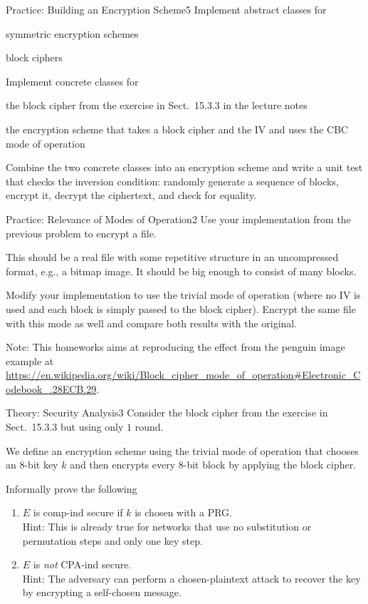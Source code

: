 \documentclass[a4paper]{article}
\begin{document}
\header

\begin{problem}{Practice: Building an Encryption Scheme}{5}
Implement abstract classes for
\begin{compactitem}
 \item symmetric encryption schemes
 \item block ciphers
\end{compactitem}

Implement concrete classes for
\begin{compactitem}
 \item the block cipher from the exercise in Sect.~15.3.3 in the lecture notes
 \item the encryption scheme that takes a block cipher and the IV and uses the CBC mode of operation
\end{compactitem}

Combine the two concrete classes into an encryption scheme and write a unit test that checks the inversion condition: randomly generate a sequence of blocks, encrypt it, decrypt the ciphertext, and check for equality.
\end{problem}

\begin{problem}{Practice: Relevance of Modes of Operation}{2}
Use your implementation from the previous problem to encrypt a file.

This should be a real file with some repetitive structure in an uncompressed format, e.g., a bitmap image.
It should be big enough to consist of many blocks.

Modify your implementation to use the trivial mode of operation (where no IV is used and each block is simply passed to the block cipher).
Encrypt the same file with this mode as well and compare both results with the original.

Note: This homeworks aims at reproducing the effect from the penguin image example at \url{https://en.wikipedia.org/wiki/Block_cipher_mode_of_operation#Electronic_Codebook_.28ECB.29}.
\end{problem}

\begin{problem}{Theory: Security Analysis}{3}
Consider the block cipher from the exercise in Sect.~15.3.3 but using only $1$ round.

We define an encryption scheme using the trivial mode of operation that chooses an $8$-bit key $k$ and then encrypts every $8$-bit block by applying the block cipher.

Informally prove the following
\begin{enumerate}
  \item $E$ is comp-ind secure if $k$ is chosen with a PRG.\\
    Hint: This is already true for networks that use no substitution or permutation steps and only one key step.
  \item $E$ is \emph{not} CPA-ind secure.\\
   Hint: The adversary can perform a chosen-plaintext attack to recover the key by encrypting a self-chosen message.
\end{enumerate}
\end{problem}
\end{document}
